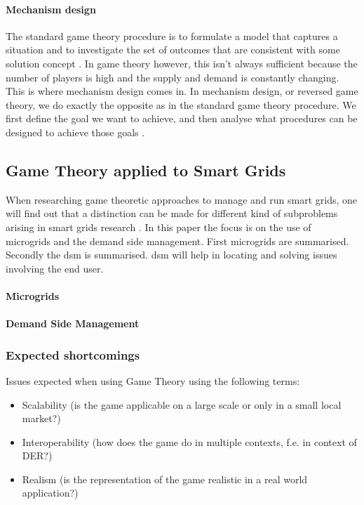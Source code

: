 
\paragraph{Mechanism design}
The standard game theory procedure is to formulate a model that
captures a situation and to investigate the set of outcomes that are
consistent with some solution concept \cite{CourseInGameTheory}. In game theory however, this isn't always sufficient because the number of players is high and the supply and demand is constantly changing. This is where mechanism design comes in. In mechanism design, or reversed game theory, we do exactly the opposite as in the standard game theory procedure. We first define the goal we want to achieve, and then analyse what procedures can be designed to achieve those goals \cite{SalfatiRabinovici2014}. 


\subsection{Game Theory applied to Smart Grids}
When researching game theoretic approaches to manage and run smart grids, one will find out that a distinction can be made for different kind of subproblems arising in smart grids research \cite{keypaper}. In this paper the focus is on the use of microgrids and the demand side management. First microgrids are summarised. Secondly the \ac{dsm} is summarised. \ac{dsm} will help in locating and solving issues involving the end user. 

\paragraph{Microgrids}
\paragraph{Demand Side Management}


\subsubsection{Expected shortcomings}

Issues expected when using Game Theory using the following terms:
\begin{itemize}
	\item Scalability (is the game applicable on a large scale or only in a small local market?)
	\item Interoperability (how does the game do in multiple contexts, f.e. in context of DER?)
	\item Realism (is the representation of the game realistic in a real world application?)
\end{itemize}

